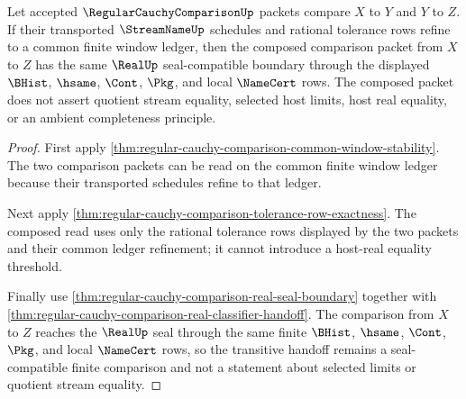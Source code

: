 \begin{theorem}
\label{thm:regular-cauchy-comparison-seal-compatible-transitivity}
Let accepted $\RegularCauchyComparisonUp$ packets compare $X$ to $Y$ and $Y$ to $Z$. If their transported $\StreamNameUp$ schedules and rational tolerance rows refine to a common finite window ledger, then the composed comparison packet from $X$ to $Z$ has the same $\RealUp$ seal-compatible boundary through the displayed $\BHist$, $\hsame$, $\Cont$, $\Pkg$, and local $\NameCert$ rows. The composed packet does not assert quotient stream equality, selected host limits, host real equality, or an ambient completeness principle.
\end{theorem}
\begin{proof}
First apply \autoref{thm:regular-cauchy-comparison-common-window-stability}. The two comparison packets can be read on the common finite window ledger because their transported schedules refine to that ledger.

Next apply \autoref{thm:regular-cauchy-comparison-tolerance-row-exactness}. The composed read uses only the rational tolerance rows displayed by the two packets and their common ledger refinement; it cannot introduce a host-real equality threshold.

Finally use \autoref{thm:regular-cauchy-comparison-real-seal-boundary} together with \autoref{thm:regular-cauchy-comparison-real-classifier-handoff}. The comparison from $X$ to $Z$ reaches the $\RealUp$ seal through the same finite $\BHist$, $\hsame$, $\Cont$, $\Pkg$, and local $\NameCert$ rows, so the transitive handoff remains a seal-compatible finite comparison and not a statement about selected limits or quotient stream equality.
\end{proof}

